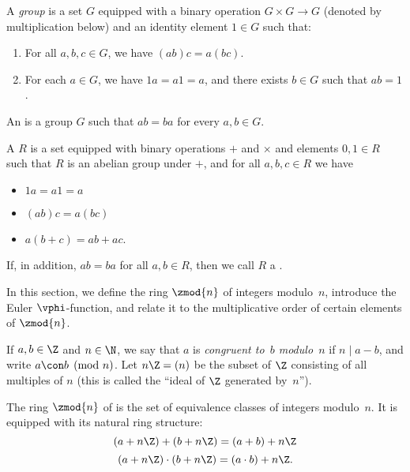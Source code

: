 \begin{definition}[Group]\label{defn:group}
A {\em group} is a set $G$ equipped with a binary operation
$G \times G \to G$ (denoted by multiplication below)
and an identity element $1\in G$ such that:
\begin{enumerate}
\item For all $a,b,c\in G$, we have $(ab)c = a(bc)$.
\item For each $a\in G$, we have $1a=a1=a$, and there exists $b\in G$ such that
$ab = 1$.
\end{enumerate}
\end{definition}

\begin{definition}\label{defn:abelian}
An  is a group $G$
such that $ab=ba$ for every $a,b\in G$.
\end{definition}


\begin{definition}[Ring]\label{defn:ring}
A  $R$ is a set equipped with binary operations
$+$ and $\times$ and elements $0,1\in R$ such that
$R$ is an abelian group under $+$,
and for all $a,b,c \in R$ we have
\begin{itemize}
\item $1a = a1 = a$
\item $(ab)c = a(bc)$
\item $a(b+c) = ab + ac$.
\end{itemize}
If, in addition, $ab=ba$ for all $a,b\in R$, then we
call $R$ a .
\end{definition}

In this section, we define the ring $\zmod{n}$ of integers modulo~$n$,
introduce the Euler $\vphi$-function,
 and relate it to the multiplicative
order of certain elements of $\zmod{n}$.

If $a,b\in\Z$ and $n\in\N$, we say that $a$ is {\em congruent to~$b$
  modulo~$n$} if $n\mid a-b$, and write $a\con b\pmod{n}$.  Let
$n\Z=(n)$ be the subset of $\Z$ consisting of all multiples of $n$
(this is called the ``ideal of $\Z$ generated by~$n$'').
\begin{definition}
  The ring $\zmod{n}$ of  is the set of
  equivalence classes of integers modulo~$n$.  It is equipped with its
  natural ring structure:
$$
  (a + n\Z) + (b + n\Z) = (a+b) + n\Z
$$
$$
  (a + n\Z) \cdot (b + n\Z) = (a\cdot b) + n\Z.
$$
\end{definition}


